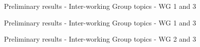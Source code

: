 \documentclass[9pt]{beamer}
\begin{document}
\begin{frame}{Preliminary results - Inter-working Group topics - WG 1 and 3}
	
	\begin{table}
		
		
		
		
	\end{table}
	
\end{frame}


\begin{frame}{Preliminary results - Inter-working Group topics - WG 1 and 3}
	
	\begin{table}
		
		
		
		
	\end{table}
	
\end{frame}


\begin{frame}{Preliminary results - Inter-working Group topics - WG 2 and 3}
	
	\begin{table}
		
		
		
		
	\end{table}
	
\end{frame}
\end{document}
